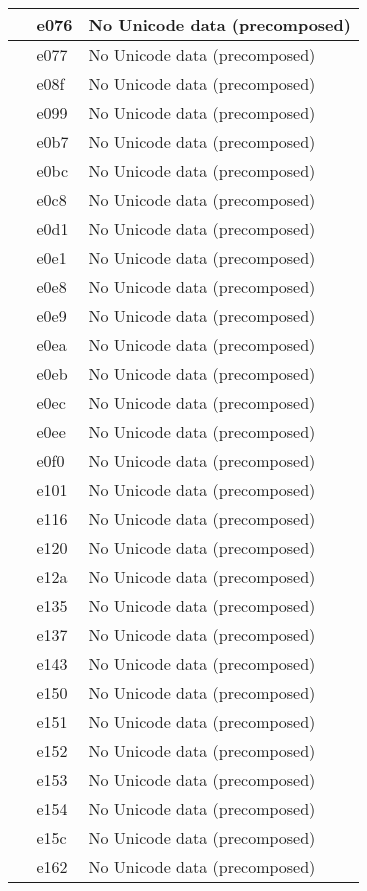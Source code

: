 \documentclass[12pt,letterpaper,openany]{book}
\begin{document}
\begin{center}
\begin{supertabular}{|m{0.25in}|m{0.5in}|m{4in}|}
 & e076 & No Unicode data (precomposed)\\\hline
 & e077 & No Unicode data (precomposed)\\\hline
 & e08f & No Unicode data (precomposed)\\\hline
 & e099 & No Unicode data (precomposed)\\\hline
 & e0b7 & No Unicode data (precomposed)\\\hline
 & e0bc & No Unicode data (precomposed)\\\hline
 & e0c8 & No Unicode data (precomposed)\\\hline
 & e0d1 & No Unicode data (precomposed)\\\hline
 & e0e1 & No Unicode data (precomposed)\\\hline
 & e0e8 & No Unicode data (precomposed)\\\hline
 & e0e9 & No Unicode data (precomposed)\\\hline
 & e0ea & No Unicode data (precomposed)\\\hline
 & e0eb & No Unicode data (precomposed)\\\hline
 & e0ec & No Unicode data (precomposed)\\\hline
 & e0ee & No Unicode data (precomposed)\\\hline
 & e0f0 & No Unicode data (precomposed)\\\hline
 & e101 & No Unicode data (precomposed)\\\hline
 & e116 & No Unicode data (precomposed)\\\hline
 & e120 & No Unicode data (precomposed)\\\hline
 & e12a & No Unicode data (precomposed)\\\hline
 & e135 & No Unicode data (precomposed)\\\hline
 & e137 & No Unicode data (precomposed)\\\hline
 & e143 & No Unicode data (precomposed)\\\hline
 & e150 & No Unicode data (precomposed)\\\hline
 & e151 & No Unicode data (precomposed)\\\hline
 & e152 & No Unicode data (precomposed)\\\hline
 & e153 & No Unicode data (precomposed)\\\hline
 & e154 & No Unicode data (precomposed)\\\hline
 & e15c & No Unicode data (precomposed)\\\hline
 & e162 & No Unicode data (precomposed)\\\hline

\end{supertabular}
\end{center}
\end{document}

